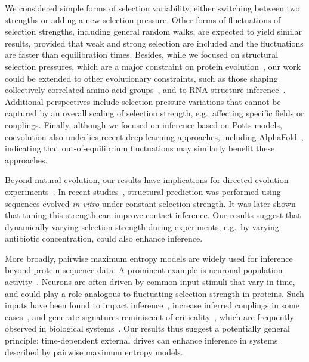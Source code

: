 \documentclass[
 reprint,








nobibnotes,

 amsmath,amssymb,
 aps,
 prl,
 longbibliography






]{revtex4-2}
\begin{document}
We considered simple forms of selection variability, either switching between two strengths or adding a new selection pressure. Other forms of fluctuations of selection strengths, including general random walks, are expected to yield similar results, provided that weak and strong selection are included and the fluctuations are faster than equilibration times. Besides, while we focused on structural selection pressures, which are a major constraint on protein evolution~\cite{morcos_coevolutionary_2014}, our work could be extended to other evolutionary constraints, such as those shaping collectively correlated amino acid groups~\cite{Halabi09,Rivoire16,Wang19,Dietler24}, and to RNA structure inference~\cite{Zerihun19}. Additional perspectives include selection pressure variations that cannot be captured by an overall scaling of selection strength, e.g.\ affecting specific fields or couplings.
Finally, although we focused on inference based on Potts models, coevolution also underlies recent deep learning approaches, including AlphaFold~\cite{Jumper21}, indicating that out-of-equilibrium fluctuations may similarly benefit these approaches.

Beyond natural evolution, our results have implications for directed evolution experiments~\cite{Arnold18}.
In recent studies~\cite{Fantini2019,STIFFLER2020}, structural prediction was performed using sequences evolved \textit{in vitro} under constant selection strength. It was later shown~\cite{Bisardi2021} that tuning this strength can improve contact inference.
Our results suggest that dynamically varying selection strength during experiments, e.g.\ by varying antibiotic concentration, could also enhance inference.

More broadly, pairwise maximum entropy models are widely used for inference beyond protein sequence data. A prominent example is neuronal population activity~\cite{Schneidman06,meshulam_collective_2017,meshulam_statistical_2025}. Neurons are often driven by common input stimuli that vary in time, and could play a role analogous to fluctuating selection strength in proteins. Such inputs have been found to impact inference~\cite{tyrcha_effect_2013}, increase inferred couplings in some cases~\cite{roudi_ising_2009}, and generate signatures reminiscent of criticality~\cite{schwab_zipfs_2014,ngampruetikorn_extrinsic_2025}, which are frequently observed in biological systems~\cite{Mora11}. Our results thus suggest a potentially general principle: time-dependent external drives can enhance inference in systems described by pairwise maximum entropy models.
\end{document}
